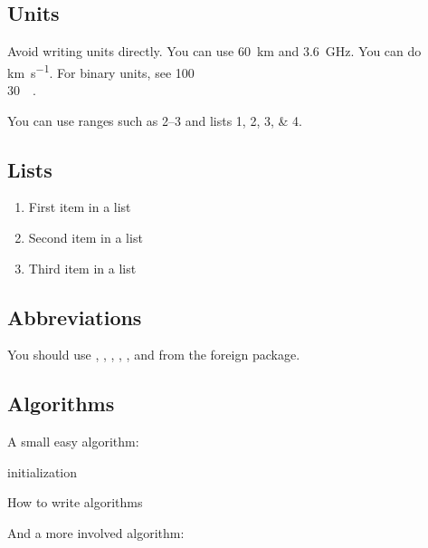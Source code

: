 \subsection{Units}
Avoid writing units directly.
You can use \SI{60}{\km} and \SI{3.6}{\giga\Hz}.
You can do \si{\km\per\second}.
For binary units, see \SI{100}{\mebi\byte} \\ \SI[prefixes-as-symbols=false]{30}{\kibi\bit}.

You can use ranges such as \numrange{2}{3} and
lists \numlist{1;2;3;4}.


\subsection{Lists}

\lipsum[5] %

\begin{enumerate}[noitemsep] %
\item First item in a list
\item Second item in a list
\item Third item in a list
\end{enumerate}

\subsection{Abbreviations}
You should use \eg, \etc, \adhoc, \circa, \ala, and \apriori from the foreign package.

\subsection{Algorithms}
A small easy algorithm:

\begin{algorithm}[H]
\SetAlgoLined
{}

initialization\; 
\caption{How to write algorithms}
\end{algorithm}

And a more involved algorithm:



